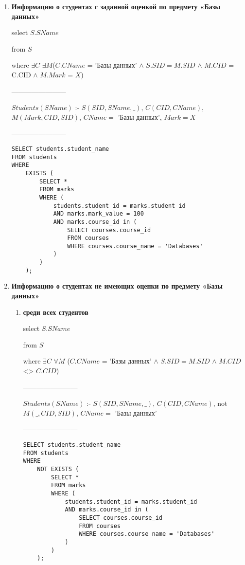 \documentclass[12pt]{article}
\begin{document}
\begin{enumerate}	
     \item \textbf{Информацию о студентах с заданной оценкой по предмету «Базы данных»}
     		
     		select   $S.SName$  
     		
     		from   $S$   
     		
     		where   $\exists C$ $\exists M$($C.CName$ =  'Базы данных' $\wedge$ $S.SID = M.SID$ $\wedge$ $M.CID$ = C.CID $\wedge$ $M.Mark$ = $X$)
     		
		------------------------
     		
     		$Students(SName)$ :- $S(SID, SName, \_)$, $C(CID, CName)$, $M(Mark, CID, SID)$, $CName = $ 'Базы данных', $Mark = X$

		------------------------     		

		\begin{verbatim}
SELECT students.student_name
FROM students 
WHERE 
	EXISTS (
		SELECT * 
		FROM marks 
		WHERE (
			students.student_id = marks.student_id 
			AND marks.mark_value = 100 
			AND marks.course_id in (
				SELECT courses.course_id 
				FROM courses 
				WHERE courses.course_name = 'Databases'
			)
		)
	);
		\end{verbatim}
     
    \item \textbf{Информацию о студентах не имеющих оценки по предмету «Базы данных»}
    
	 \begin{enumerate}    
        \item \textbf{среди всех студентов}
        
     		select   $S.SName$  
     		
     		from   $S$   
     		
     		where   $\exists C$ $\forall M$ ($C.CName$ =  'Базы данных' $\wedge$ $S.SID = M.SID$ $\wedge$ $M.CID$ <> $C.CID$)
 
		------------------------
     		
     		$Students(SName)$ :- $S(SID, SName, \_)$, $C(CID, CName)$, not $M(\_, CID, SID)$, $CName = $ 'Базы данных'

		------------------------     		

				\begin{verbatim}
SELECT students.student_name
FROM students 
WHERE 
	NOT EXISTS (
		SELECT * 
		FROM marks 
		WHERE (
			students.student_id = marks.student_id 
			AND marks.course_id in (
				SELECT courses.course_id 
				FROM courses 
				WHERE courses.course_name = 'Databases'
			)
		)
	);
				\end{verbatim}
                              

\end{enumerate}
\end{enumerate}
\end{document}
